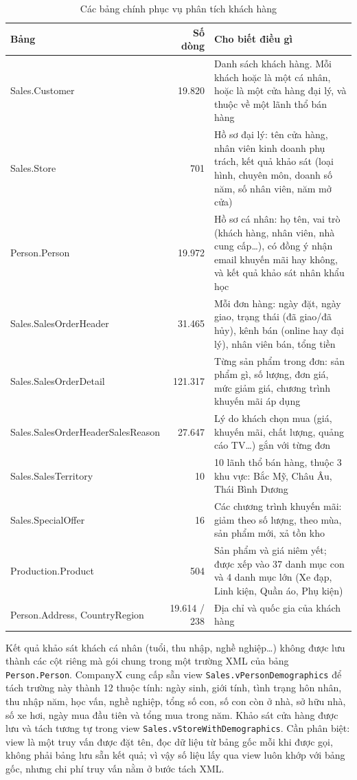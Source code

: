 \begin{table}[H]
\centering
\caption{Các bảng chính phục vụ phân tích khách hàng}
\label{tab:tables}
\small
\begin{tabularx}{\textwidth}{>{\raggedright\arraybackslash}p{4.3cm} r X}
\toprule
\rowcolor{tblhead} \textbf{Bảng} & \textbf{Số dòng} & \textbf{Cho biết điều gì} \\
\midrule
Sales.Customer & 19.820 & Danh sách khách hàng. Mỗi khách hoặc là một cá nhân, hoặc là một cửa hàng đại lý, và thuộc về một lãnh thổ bán hàng \\
Sales.Store & 701 & Hồ sơ đại lý: tên cửa hàng, nhân viên kinh doanh phụ trách, kết quả khảo sát (loại hình, chuyên môn, doanh số năm, số nhân viên, năm mở cửa) \\
Person.Person & 19.972 & Hồ sơ cá nhân: họ tên, vai trò (khách hàng, nhân viên, nhà cung cấp\dots), có đồng ý nhận email khuyến mãi hay không, và kết quả khảo sát nhân khẩu học \\
Sales.SalesOrderHeader & 31.465 & Mỗi đơn hàng: ngày đặt, ngày giao, trạng thái (đã giao/đã hủy), kênh bán (online hay đại lý), nhân viên bán, tổng tiền \\
Sales.SalesOrderDetail & 121.317 & Từng sản phẩm trong đơn: sản phẩm gì, số lượng, đơn giá, mức giảm giá, chương trình khuyến mãi áp dụng \\
Sales.SalesOrderHeader\-SalesReason & 27.647 & Lý do khách chọn mua (giá, khuyến mãi, chất lượng, quảng cáo TV\dots) gắn với từng đơn \\
Sales.SalesTerritory & 10 & 10 lãnh thổ bán hàng, thuộc 3 khu vực: Bắc Mỹ, Châu Âu, Thái Bình Dương \\
Sales.SpecialOffer & 16 & Các chương trình khuyến mãi: giảm theo số lượng, theo mùa, sản phẩm mới, xả tồn kho \\
Production.Product & 504 & Sản phẩm và giá niêm yết; được xếp vào 37 danh mục con và 4 danh mục lớn (Xe đạp, Linh kiện, Quần áo, Phụ kiện) \\
Person.Address, CountryRegion & 19.614 / 238 & Địa chỉ và quốc gia của khách hàng \\
\bottomrule
\end{tabularx}
\end{table}

Kết quả khảo sát khách cá nhân (tuổi, thu nhập, nghề nghiệp\dots) không được lưu thành các cột riêng mà gói chung trong một trường XML của bảng \texttt{Person.Person}. CompanyX cung cấp sẵn view \texttt{Sales.vPersonDemographics} để tách trường này thành 12 thuộc tính: ngày sinh, giới tính, tình trạng hôn nhân, thu nhập năm, học vấn, nghề nghiệp, tổng số con, số con còn ở nhà, sở hữu nhà, số xe hơi, ngày mua đầu tiên và tổng mua trong năm. Khảo sát cửa hàng được lưu và tách tương tự trong view \texttt{Sales.vStoreWithDemographics}. Cần phân biệt: view là một truy vấn được đặt tên, đọc dữ liệu từ bảng gốc mỗi khi được gọi, không phải bảng lưu sẵn kết quả; vì vậy số liệu lấy qua view luôn khớp với bảng gốc, nhưng chi phí truy vấn nằm ở bước tách XML.

